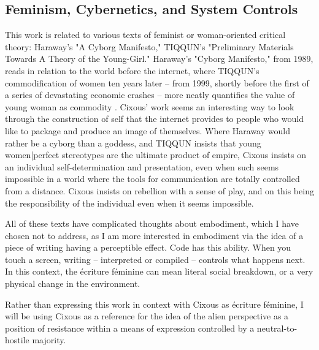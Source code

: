 \subsection{Feminism, Cybernetics, and System Controls}
This work is related to various texts of feminist or woman-oriented critical theory: Haraway's "A Cyborg Manifesto," TIQQUN's "Preliminary Materials Towards A Theory of the Young-Girl." Haraway's "Cyborg Manifesto," from 1989, reads in relation to the world before the internet, where TIQQUN's commodification of women ten years later – from 1999, shortly before the first of a series of devastating economic crashes – more neatly quantifies the value of young woman as commodity \parencite{cixous}\parencite{tiqqun}. Cixous' work seems an interesting way to look through the construction of self that the internet provides to people who would like to package and produce an image of themselves. Where Haraway would rather be a cyborg than a goddess, and TIQQUN insists that young women|perfect stereotypes are the ultimate product of empire, Cixous insists on an individual self-determination and presentation, even when such seems impossible in a world where the tools for communication are totally controlled from a distance. Cixous insists on rebellion with a sense of play, and on this being the responsibility of the individual even when it seems impossible. 

All of these texts have complicated thoughts about embodiment, which I have chosen not to address, as I am more interested in embodiment via the idea of a piece of writing having a perceptible effect. Code has this ability. When you touch a screen, writing – interpreted or compiled – controls what happens next. In this context, the écriture féminine can mean literal social breakdown, or a very physical change in the environment.

Rather than expressing this work in context with Cixous as écriture féminine, I will be using Cixous as a reference for the idea of the alien perspective as a position of resistance within a means of expression controlled by a neutral-to-hostile majority.

